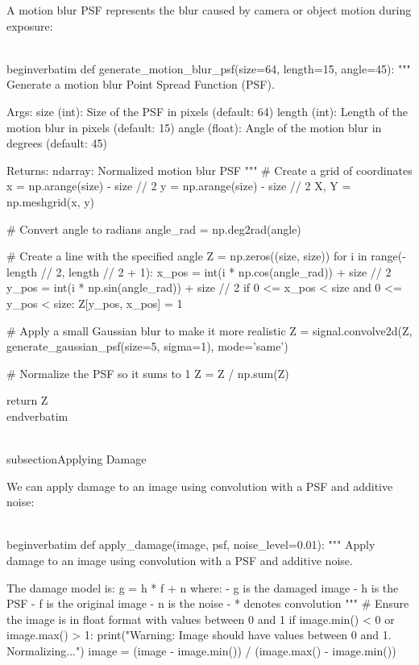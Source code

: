 A motion blur PSF represents the blur caused by camera or object motion during exposure:

\\begin{verbatim}
def generate_motion_blur_psf(size=64, length=15, angle=45):
    """
    Generate a motion blur Point Spread Function (PSF).
    
    Args:
        size (int): Size of the PSF in pixels (default: 64)
        length (int): Length of the motion blur in pixels (default: 15)
        angle (float): Angle of the motion blur in degrees (default: 45)
        
    Returns:
        ndarray: Normalized motion blur PSF
    """
    # Create a grid of coordinates
    x = np.arange(size) - size // 2
    y = np.arange(size) - size // 2
    X, Y = np.meshgrid(x, y)
    
    # Convert angle to radians
    angle_rad = np.deg2rad(angle)
    
    # Create a line with the specified angle
    Z = np.zeros((size, size))
    for i in range(-length // 2, length // 2 + 1):
        x_pos = int(i * np.cos(angle_rad)) + size // 2
        y_pos = int(i * np.sin(angle_rad)) + size // 2
        if 0 <= x_pos < size and 0 <= y_pos < size:
            Z[y_pos, x_pos] = 1
    
    # Apply a small Gaussian blur to make it more realistic
    Z = signal.convolve2d(Z, generate_gaussian_psf(size=5, sigma=1), 
                          mode='same')
    
    # Normalize the PSF so it sums to 1
    Z = Z / np.sum(Z)
    
    return Z
\\end{verbatim}

\\subsection{Applying Damage}

We can apply damage to an image using convolution with a PSF and additive noise:

\\begin{verbatim}
def apply_damage(image, psf, noise_level=0.01):
    """
    Apply damage to an image using convolution with a PSF and additive noise.
    
    The damage model is: g = h * f + n
    where:
    - g is the damaged image
    - h is the PSF
    - f is the original image
    - n is the noise
    - * denotes convolution
    """
    # Ensure the image is in float format with values between 0 and 1
    if image.min() < 0 or image.max() > 1:
        print("Warning: Image should have values between 0 and 1. Normalizing...")
        image = (image - image.min()) / (image.max() - image.min())
    
